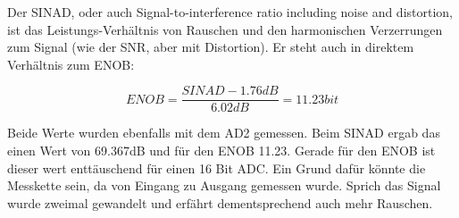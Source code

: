 Der SINAD, oder auch \glqq Signal-to-interference ratio including noise and distortion\grqq , ist das Leistungs-Verhältnis  von Rauschen und den harmonischen Verzerrungen zum Signal (wie der SNR, aber mit Distortion). Er steht auch in direktem Verhältnis zum ENOB:

\begin{equation}
ENOB=\frac{SINAD-1.76dB}{6.02dB}=11.23\si{bit}
\end{equation} 

Beide Werte wurden ebenfalls mit dem AD2 gemessen. Beim SINAD ergab das einen Wert von 69.367dB und für den ENOB 11.23. Gerade für den ENOB ist dieser wert enttäuschend für einen 16 Bit ADC. Ein Grund dafür könnte die Messkette sein, da von Eingang zu Ausgang gemessen wurde. Sprich das Signal wurde zweimal gewandelt und erfährt dementsprechend auch mehr Rauschen. 